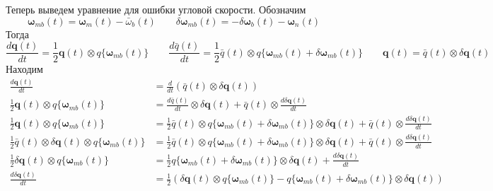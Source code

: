 \documentclass[12pt]{article}
\begin{document}
Теперь выведем уравнение для ошибки угловой скорости. Обозначим
\begin{equation}
    \pmb{\omega}_{mb}(t)=\pmb{\omega}_m(t) - \bar{\omega}_b(t) \qquad
    \delta\pmb{\omega}_{mb}(t)=-\delta\pmb{\omega}_b(t) - \pmb{\omega}_n(t) \qquad
\end{equation}
Тогда
\begin{equation}
    \frac{d \pmb{q}(t)}{dt}=\frac{1}{2}\pmb{q}(t)\otimes q\{\pmb{\omega}_{mb}(t)\}
    \qquad
    \frac{d \bar{q}(t)}{dt}=\frac{1}{2}\bar{q}(t)\otimes q\{\pmb{\omega}_{mb}(t)+\delta \pmb{\omega}_{mb}(t)\}
    \qquad
    \pmb{q}(t)=\bar{q}(t)\otimes \delta\pmb{q}(t)
\end{equation}
Находим
\begin{equation}
    \begin{aligned}
        \frac{d \pmb{q}(t)}{d t}
         & =\frac{d}{d t}(\bar{q}(t)\otimes \delta\pmb{q}(t))                                                          \\
        \frac{1}{2}\pmb{q}(t)\otimes q\{\pmb{\omega}_{mb}(t)\}
         & =\frac{d\bar{q}(t)}{d t}\otimes \delta\pmb{q}(t)
        +\bar{q}(t)\otimes \frac{d\delta\pmb{q}(t)}{d t}                                                               \\
        \frac{1}{2}\pmb{q}(t)\otimes q\{\pmb{\omega}_{mb}(t)\}
         & =\frac{1}{2}\bar{q}(t)\otimes q\{\pmb{\omega}_{mb}(t)+\delta \pmb{\omega}_{mb}(t)\}\otimes \delta\pmb{q}(t)
        +\bar{q}(t)\otimes \frac{d\delta\pmb{q}(t)}{d t}                                                               \\
        \frac{1}{2}\bar{q}(t)\otimes \delta\pmb{q}(t) \otimes q\{\pmb{\omega}_{mb}(t)\}
         & =\frac{1}{2}\bar{q}(t)\otimes q\{\pmb{\omega}_{mb}(t)+\delta \pmb{\omega}_{mb}(t)\}\otimes \delta\pmb{q}(t)
        +\bar{q}(t)\otimes \frac{d\delta\pmb{q}(t)}{d t}                                                               \\
        \frac{1}{2}\delta\pmb{q}(t) \otimes q\{\pmb{\omega}_{mb}(t)\}
         & =\frac{1}{2}q\{\pmb{\omega}_{mb}(t)+\delta \pmb{\omega}_{mb}(t)\}\otimes \delta\pmb{q}(t)
        +\frac{d\delta\pmb{q}(t)}{d t}                                                                                 \\
        \frac{d\delta\pmb{q}(t)}{d t}
         & = \frac{1}{2}\left(\delta\pmb{q}(t) \otimes q\{\pmb{\omega}_{mb}(t)\}-
        q\{\pmb{\omega}_{mb}(t)+\delta \pmb{\omega}_{mb}(t)\}\otimes \delta\pmb{q}(t) \right)                          \\
    \end{aligned}
\end{equation}
\end{document}
